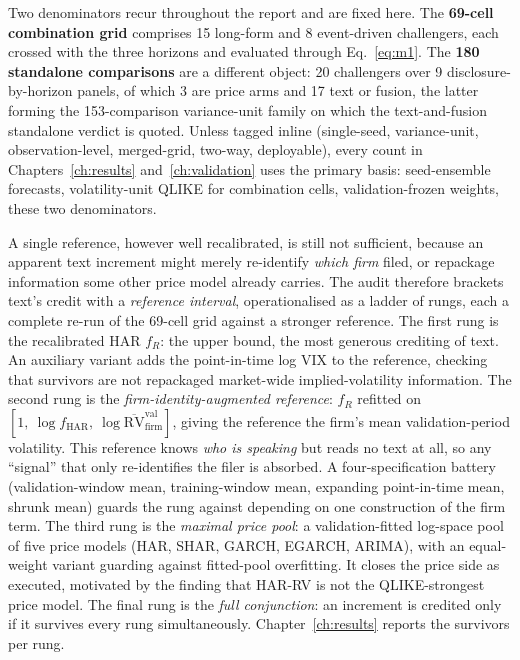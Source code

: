 Two denominators recur throughout the report and are fixed here. The \textbf{69-cell combination grid} comprises 15 long-form and 8 event-driven challengers, each crossed with the three horizons and evaluated through Eq.~\eqref{eq:m1}. %
The \textbf{180 standalone comparisons} are a different object: 20 challengers over 9 disclosure-by-horizon panels, of which 3 are price arms and 17 text or fusion, the latter forming the 153-comparison variance-unit family on which the text-and-fusion standalone verdict is quoted. %
Unless tagged inline (single-seed, variance-unit, observation-level, merged-grid, two-way, deployable), every count in Chapters~\ref{ch:results} and~\ref{ch:validation} uses the primary basis: seed-ensemble forecasts, volatility-unit QLIKE for combination cells, validation-frozen weights, these two denominators. %

A single reference, however well recalibrated, is still not sufficient, because an apparent text increment might merely re-identify \emph{which firm} filed, or repackage information some other price model already carries. The audit therefore brackets text's credit with a \emph{reference interval}, operationalised as a ladder of rungs, each a complete re-run of the 69-cell grid against a stronger reference. The first rung is the recalibrated HAR $f_R$: the upper bound, the most generous crediting of text. An auxiliary variant adds the point-in-time log VIX to the reference, checking that survivors are not repackaged market-wide implied-volatility information. %
The second rung is the \emph{firm-identity-augmented reference}: $f_R$ refitted on $[1,\ \log f_{\text{HAR}},\ \log \overline{\mathrm{RV}}^{\text{val}}_{\text{firm}}]$, giving the reference the firm's mean validation-period volatility. This reference knows \emph{who is speaking} but reads no text at all, so any ``signal'' that only re-identifies the filer is absorbed. A four-specification battery (validation-window mean, training-window mean, expanding point-in-time mean, shrunk mean) guards the rung against depending on one construction of the firm term. %
The third rung is the \emph{maximal price pool}: a validation-fitted log-space pool of five price models (HAR, SHAR, GARCH, EGARCH, ARIMA), with an equal-weight variant guarding against fitted-pool overfitting. It closes the price side as executed, motivated by the finding that HAR-RV is not the QLIKE-strongest price model. %
The final rung is the \emph{full conjunction}: an increment is credited only if it survives every rung simultaneously. Chapter~\ref{ch:results} reports the survivors per rung.

